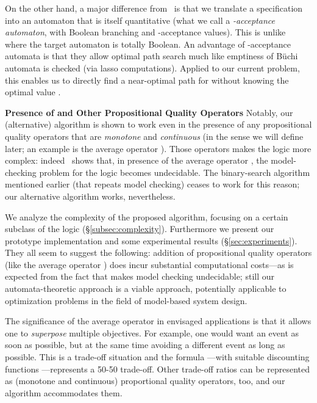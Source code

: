 \documentclass[a4paper,USenglish,numberwithinsect]{lipics}
\theoremstyle{definition}
\theoremstyle{remark}
\theoremstyle{plain}
\begin{document}
On the other hand, a major difference from~\cite{AlmagorBK14} 
is that we translate a specification
 into an automaton that is itself quantitative
(what we call a \emph{-acceptance
automaton}, with  Boolean
branching and -acceptance values). This is 
unlike~\cite{AlmagorBK14} where the target automaton
is totally Boolean.
An advantage of  -acceptance
automata is that they allow optimal path search 
much like
emptiness of B\"uchi automata is checked (via
lasso computations). 
Applied to our current problem, 
this enables us to directly find a
near-optimal path
for 
without knowing the optimal value
.

\noindent
\textbf{Presence of  and Other Propositional Quality Operators}\quad
Notably,  our  (alternative) algorithm is shown to work even in the presence
 of
 any propositional quality operators that are \emph{monotone} and
 \emph{continuous} (in the sense we will define later; an example is the
 average operator ). 
Those operators makes the logic  more complex: indeed~\cite{AlmagorBK14}
shows that, in presence of 
 the average operator , the model-checking problem for the logic
  becomes
 undecidable.
 The binary-search algorithm mentioned earlier (that
 repeats model checking) ceases to work for this reason; our
 alternative algorithm works, nevertheless.





We analyze the complexity of the proposed algorithm, focusing on a certain
subclass of the logic  (\S\ref{subsec:complexity}). Furthermore
we present our prototype implementation and some experimental
results (\S\ref{sec:experiments}). They all seem to suggest the following: addition of propositional
quality
operators (like the average operator ) does incur substantial
computational costs---as is expected from the fact that  makes
model checking undecidable; still our automata-theoretic approach is a
viable approach, potentially applicable to optimization 
problems in the field of model-based system design. 

The significance of the average operator  in
envisaged applications is that it allows one to \emph{superpose} multiple
objectives. For example, one would want an event  as soon as
possible, but at the same time avoiding a different event  as long as
possible. This is a trade-off situation and the formula
---with suitable discounting
functions ---represents a 50-50 trade-off. Other
 trade-off ratios can be represented as (monotone and continuous) proportional quality operators, too,
and our algorithm accommodates them.
\end{document}
